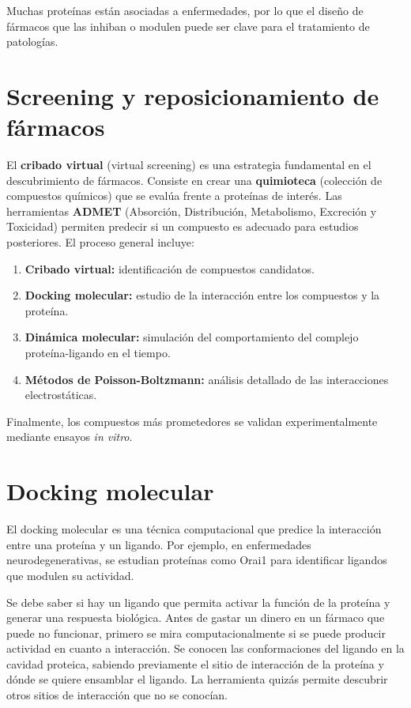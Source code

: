 Muchas proteínas están asociadas a enfermedades, por lo que el diseño de fármacos que las inhiban o modulen puede ser clave para el tratamiento de patologías.

\section{Screening y reposicionamiento de fármacos}
El \textbf{cribado virtual} (virtual screening) es una estrategia fundamental en el descubrimiento de fármacos. Consiste en crear una \textbf{quimioteca} (colección de compuestos químicos) que se evalúa frente a proteínas de interés. Las herramientas \textbf{ADMET} (Absorción, Distribución, Metabolismo, Excreción y Toxicidad) permiten predecir si un compuesto es adecuado para estudios posteriores.
El proceso general incluye:
\begin{enumerate}
\item \textbf{Cribado virtual:} identificación de compuestos candidatos.
\item \textbf{Docking molecular:} estudio de la interacción entre los compuestos y la proteína.
\item \textbf{Dinámica molecular:} simulación del comportamiento del complejo proteína-ligando en el tiempo.
\item \textbf{Métodos de Poisson-Boltzmann:} análisis detallado de las interacciones electrostáticas.
\end{enumerate}
Finalmente, los compuestos más prometedores se validan experimentalmente mediante ensayos \textit{in vitro}.

\section{Docking molecular}
El docking molecular es una técnica computacional que predice la interacción entre una proteína y un ligando. Por ejemplo, en enfermedades neurodegenerativas, se estudian proteínas como Orai1 para identificar ligandos que modulen su actividad.

Se debe saber si hay un ligando que permita activar la función de la proteína y generar una respuesta biológica. Antes de gastar un dinero en un fármaco que puede no funcionar, primero se mira computacionalmente si se puede producir actividad en cuanto a interacción. Se conocen las conformaciones del ligando en la cavidad proteica, sabiendo previamente el sitio de interacción de la proteína y dónde se quiere ensamblar el ligando. La herramienta quizás permite descubrir otros sitios de interacción que no se conocían. 

